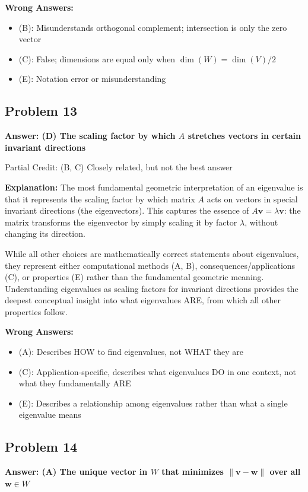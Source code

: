 \documentclass[12pt]{amsart}
\newcommand{\correct}[1]{{\color{correctgreen}\textbf{#1}}}
\newcommand{\partcred}[1]{{\color{partialblue}#1}}
\begin{document}
{\textbf{Wrong Answers:}
\begin{itemize}
\item (B): Misunderstands orthogonal complement; intersection is only the zero vector
\item (C): False; dimensions are equal only when $\dim(W) = \dim(V)/2$
\item (E): Notation error or misunderstanding
\end{itemize}

\subsection*{Problem 13}
\correct{Answer: (D) The scaling factor by which $A$ stretches vectors in certain invariant directions}

\partcred{Partial Credit: (B, C) Closely related, but not the best answer}

\textbf{Explanation:} The most fundamental geometric interpretation of an eigenvalue is that it represents the scaling factor by which matrix $A$ acts on vectors in special invariant directions (the eigenvectors). This captures the essence of $A\mathbf{v} = \lambda\mathbf{v}$: the matrix transforms the eigenvector by simply scaling it by factor $\lambda$, without changing its direction.

While all other choices are mathematically correct statements about eigenvalues, they represent either computational methods (A, B), consequences/applications (C), or properties (E) rather than the fundamental geometric meaning. Understanding eigenvalues as scaling factors for invariant directions provides the deepest conceptual insight into what eigenvalues ARE, from which all other properties follow.

\textbf{Wrong Answers:}
\begin{itemize}
\item (A): Describes HOW to find eigenvalues, not WHAT they are
\item (C): Application-specific, describes what eigenvalues DO in one context, not what they fundamentally ARE
\item (E): Describes a relationship among eigenvalues rather than what a single eigenvalue means
\end{itemize}

\subsection*{Problem 14}
\correct{Answer: (A) The unique vector in $W$ that minimizes $\|\mathbf{v} - \mathbf{w}\|$ over all $\mathbf{w} \in W$}

}
\end{document}

